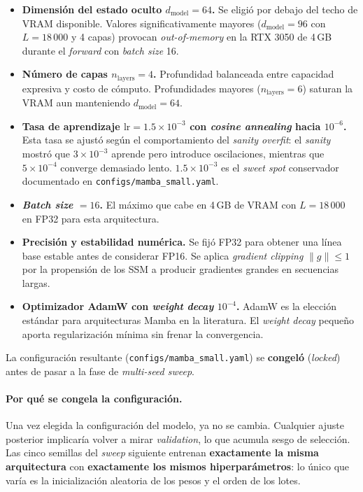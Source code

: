 \documentclass[11pt,a4paper]{article}
\begin{document}
\begin{itemize}
  \item \textbf{Dimensión del estado oculto $d_{\text{model}} = 64$.}
    Se eligió por debajo del techo de VRAM disponible. Valores
    significativamente mayores ($d_{\text{model}} = 96$ con $L =
    18\,000$ y 4 capas) provocan \textit{out-of-memory} en la RTX
    3050 de 4\,GB durante el \textit{forward} con \textit{batch
    size} 16.
  \item \textbf{Número de capas $n_{\text{layers}} = 4$.}
    Profundidad balanceada entre capacidad expresiva y costo de
    cómputo. Profundidades mayores ($n_{\text{layers}} = 6$) saturan
    la VRAM aun manteniendo $d_{\text{model}} = 64$.
  \item \textbf{Tasa de aprendizaje $\text{lr} = 1.5\!\times\!10^{-3}$
    con \textit{cosine annealing} hacia $10^{-6}$.} Esta tasa se
    ajustó según el comportamiento del \textit{sanity overfit}: el
    \textit{sanity} mostró que $3\!\times\!10^{-3}$ aprende pero
    introduce oscilaciones, mientras que $5\!\times\!10^{-4}$
    converge demasiado lento. $1.5\!\times\!10^{-3}$ es el
    \textit{sweet spot} conservador documentado en
    \texttt{configs/mamba\_small.yaml}.
  \item \textbf{\textit{Batch size} $= 16$.} El máximo que cabe en
    4\,GB de VRAM con $L = 18\,000$ en FP32 para esta arquitectura.
  \item \textbf{Precisión y estabilidad numérica.} Se fijó FP32 para
    obtener una línea base estable antes de considerar FP16. Se
    aplica \textit{gradient clipping} $\|g\| \leq 1$ por la
    propensión de los SSM a producir gradientes grandes en
    secuencias largas.
  \item \textbf{Optimizador AdamW con \textit{weight decay}
    $10^{-4}$.} AdamW es la elección estándar para arquitecturas
    Mamba en la literatura. El \textit{weight decay} pequeño aporta
    regularización mínima sin frenar la convergencia.
\end{itemize}

La configuración resultante (\texttt{configs/mamba\_small.yaml}) se
\textbf{congeló} (\textit{locked}) antes de pasar a la fase de
\textit{multi-seed sweep}.

\paragraph{Por qué se congela la configuración.}
Una vez elegida la configuración del modelo, ya no se cambia. Cualquier
ajuste posterior implicaría volver a mirar \textit{validation}, lo que
acumula sesgo de selección. Las cinco semillas del \textit{sweep}
siguiente entrenan \textbf{exactamente la misma arquitectura} con
\textbf{exactamente los mismos hiperparámetros}: lo único que varía
es la inicialización aleatoria de los pesos y el orden de los lotes.
\end{document}
